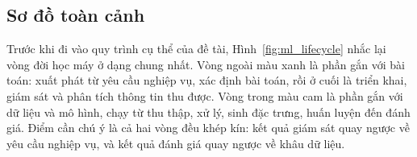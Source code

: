 \documentclass[12pt, a4paper]{report}
\begin{document}
\FloatBarrier
\subsection{Sơ đồ toàn cảnh}
\label{subsec:so_do_toan_canh}

Trước khi đi vào quy trình cụ thể của đề tài, Hình~\ref{fig:ml_lifecycle} nhắc lại vòng đời
học máy ở dạng chung nhất. Vòng ngoài màu xanh là phần gắn với bài toán: xuất phát từ yêu cầu
nghiệp vụ, xác định bài toán, rồi ở cuối là triển khai, giám sát và phân tích thông tin thu
được. Vòng trong màu cam là phần gắn với dữ liệu và mô hình, chạy từ thu thập, xử lý, sinh đặc
trưng, huấn luyện đến đánh giá. Điểm cần chú ý là cả hai vòng đều khép kín: kết quả giám sát
quay ngược về yêu cầu nghiệp vụ, và kết quả đánh giá quay ngược về khâu dữ liệu.
\end{document}
